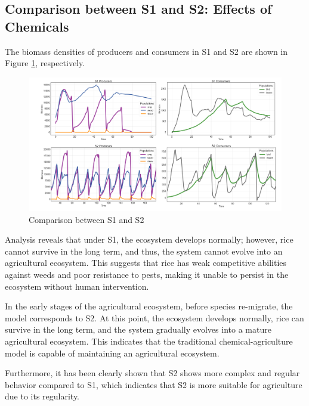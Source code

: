 \documentclass{HZNUMCM}
\begin{document}
      \subsection{Comparison between S1 and S2: Effects of Chemicals}

      The biomass densities of producers and consumers in S1 and S2 are shown in Figure \ref{fig:S1S2}, respectively.

      \begin{figure}
      \centering
      \includegraphics[width=\linewidth]{images/S1S2.png}
      \caption{Comparison between S1 and S2}
      \label{fig:S1S2}
      \end{figure}
      
      Analysis reveals that under S1, the ecosystem develops normally; 
      however, rice cannot survive in the long term, and thus, the system cannot evolve into an agricultural ecosystem. 
      This suggests that rice has weak competitive abilities against weeds and poor resistance to pests, 
      making it unable to persist in the ecosystem without human intervention.
      
      In the early stages of the agricultural ecosystem, before species re-migrate, 
      the model corresponds to S2. At this point, the ecosystem develops normally, 
      rice can survive in the long term, and the system gradually evolves into a mature agricultural ecosystem. 
      This indicates that the traditional chemical-agriculture model is capable of maintaining an agricultural ecosystem. 
      
      Furthermore, it has been clearly shown that S2 shows more complex and regular behavior compared to S1, 
      which indicates that S2 is more suitable for agriculture due to its regularity.
      
\end{document}
